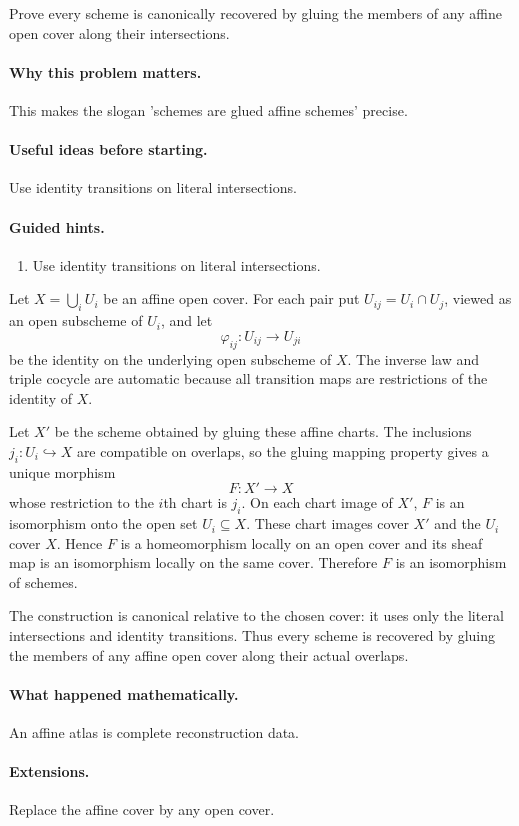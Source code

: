 \begin{problem}\label{prob:vi20-p05}
Prove every scheme is canonically recovered by gluing the members of any affine open cover along their intersections.
\end{problem}

\ifdefined\FullProblemDossiers
\paragraph{Why this problem matters.}
This makes the slogan 'schemes are glued affine schemes' precise.

\paragraph{Useful ideas before starting.}
Use identity transitions on literal intersections.

\paragraph{Guided hints.}
\begin{enumerate}
\item Use identity transitions on literal intersections.
\end{enumerate}

\begin{solution}
Let $X=\bigcup_iU_i$ be an affine open cover.  For each pair put $U_{ij}=U_i\cap U_j$, viewed as an open subscheme of $U_i$, and let
\[
\varphi_{ij}:U_{ij}\longrightarrow U_{ji}
\]
be the identity on the underlying open subscheme of $X$.  The inverse law and triple cocycle are automatic because all transition maps are restrictions of the identity of $X$.

Let $X'$ be the scheme obtained by gluing these affine charts.  The inclusions $j_i:U_i\hookrightarrow X$ are compatible on overlaps, so the gluing mapping property gives a unique morphism
\[
F:X'\longrightarrow X
\]
whose restriction to the $i$th chart is $j_i$.  On each chart image of $X'$, $F$ is an isomorphism onto the open set $U_i\subseteq X$.  These chart images cover $X'$ and the $U_i$ cover $X$.  Hence $F$ is a homeomorphism locally on an open cover and its sheaf map is an isomorphism locally on the same cover.  Therefore $F$ is an isomorphism of schemes.

The construction is canonical relative to the chosen cover: it uses only the literal intersections and identity transitions.  Thus every scheme is recovered by gluing the members of any affine open cover along their actual overlaps.
\end{solution}


\paragraph{What happened mathematically.}
An affine atlas is complete reconstruction data.

\paragraph{Extensions.}
Replace the affine cover by any open cover.
\fi
